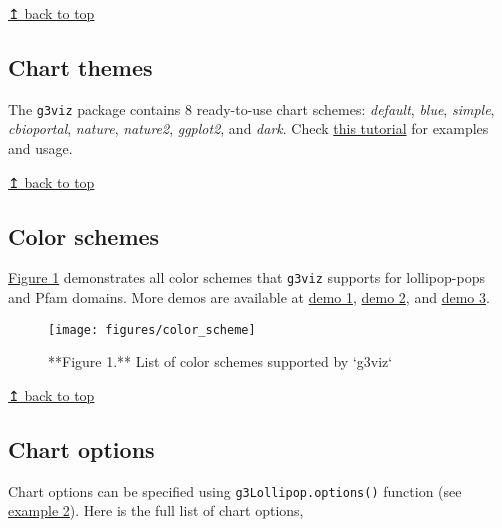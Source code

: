 \documentclass[
]{article}
\begin{document}
\hyperref[top]{↥ back to top}

\subsection{\texorpdfstring{ Chart
themes}{ Chart themes}}\label{chart-themes}

The \texttt{g3viz} package contains 8 ready-to-use chart schemes:
\emph{default}, \emph{blue}, \emph{simple}, \emph{cbioportal},
\emph{nature}, \emph{nature2}, \emph{ggplot2}, and \emph{dark}. Check
\href{chart_themes.html}{this tutorial} for examples and usage.

\hyperref[top]{↥ back to top}

\subsection{\texorpdfstring{ Color
schemes}{ Color schemes}}\label{color-schemes}

\hyperref[color_scheme_fig1]{Figure 1} demonstrates all color schemes
that \texttt{g3viz} supports for lollipop-pops and Pfam domains. More
demos are available at
\href{https://bl.ocks.org/phoeguo/raw/2868503a074a6441b5ae6d987f150d48/}{demo
1},
\href{https://bl.ocks.org/phoeguo/raw/de79b9ce9bda958173af9891ab7aec93/}{demo
2}, and
\href{https://bl.ocks.org/phoeguo/raw/81dffe0c7c6c8caae06f6a5f60c70d19/}{demo
3}.

\begin{figure}

{\centering \texttt{[image: figures/color\_scheme]} 

}

\caption{**Figure 1.** List of color schemes supported by `g3viz`}\label{fig:chunk-label}
\end{figure}

\hyperref[top]{↥ back to top}

\subsection{\texorpdfstring{ Chart
options}{ Chart options}}\label{chart-options}

Chart options can be specified using \texttt{g3Lollipop.options()}
function (see \hyperref[ex2]{example 2}). Here is the full list of chart
options,
\end{document}
